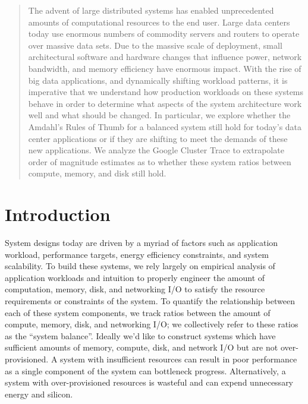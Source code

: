 \documentclass{sig-alternate}
\begin{document}
\maketitle
\begin{abstract}

The advent of large distributed systems has enabled unprecedented amounts of computational resources to the end user.
Large data centers today use enormous numbers of commodity servers and routers to operate over massive data sets.
Due to the massive scale of deployment, small architectural software and hardware changes that influence power, network bandwidth, and memory efficiency have enormous impact.
With the rise of big data applications, and dynamically shifting workload patterns, it is imperative that we understand how production workloads on these systems behave in order to determine what aspects of the system architecture work well and what should be changed.
In particular, we explore whether the Amdahl's Rules of Thumb for a balanced system still hold for today's data center applications or if they are shifting to meet the demands of these new applications.
We analyze the Google Cluster Trace to extrapolate order of magnitude estimates as to whether these system ratios between compute, memory, and disk still hold.

\end{abstract}




\section{Introduction}

System designs today are driven by a myriad of factors such as application workload, performance targets, energy efficiency constraints, and system scalability.
To build these systems, we rely largely on empirical analysis of application workloads and intuition to properly engineer the amount of computation, memory, disk, and networking I/O to satisfy the resource requirements or constraints of the system.
To quantify the relationship between each of these system components, we track ratios between the amount of compute, memory, disk, and networking I/O; we collectively refer to these ratios as the ``system balance''.
Ideally we'd like to construct systems which have sufficient amounts of memory, compute, disk, and network I/O but are not over-provisioned.
A system with insufficient resources can result in poor performance as a single component of the system can bottleneck progress.
Alternatively, a system with over-provisioned resources is wasteful and can expend unnecessary energy and silicon.
\end{document}
